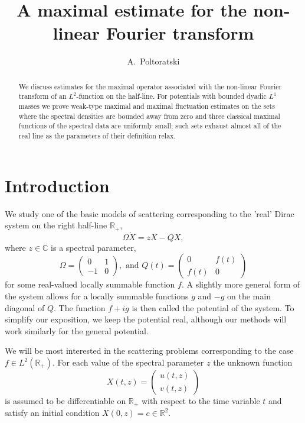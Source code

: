 \documentclass[11pt,twoside,reqno]{amsart}
\author{A.~Poltoratski}
\def\R{{\mathbb R}}
\def\C{{\mathbb{C}}}
\theoremstyle{plain}
\numberwithin{equation}{section}
\begin{document}
\begin{abstract} We discuss estimates for the maximal operator associated with the non-linear Fourier transform of an $L^2$-function on the half-line. For potentials with bounded dyadic $L^1$ masses we  prove weak-type maximal and maximal fluctuation estimates on the sets where the spectral densities are bounded away from zero and three classical maximal functions of the spectral data are uniformly small; such sets exhaust almost all of the real line as the parameters of their definition relax.
\end{abstract}

\title{A maximal estimate for the non-linear Fourier transform}





\maketitle

\section{Introduction}

We study one of the basic models of scattering corresponding to the 'real' Dirac system on the right half-line $\R_+$,
\begin{equation} \Omega \dot X =z X - QX,
	\label{eqDS}\end{equation}
where $z\in\C$ is a spectral parameter,
$$ \Omega=\begin{pmatrix} 0 & 1 \\ -1 & 0 \end{pmatrix},\textrm{ and  }Q(t)=\begin{pmatrix} 0 & f(t) \\ f(t) & 0 \end{pmatrix} $$
for some real-valued locally summable function $f$. A slightly more general form of the system allows
for a locally summable functions $g$ and $-g$ on the main diagonal of $Q$. The function $f+ig$
is then called the potential of the system.
To simplify our exposition, we keep the potential real, although our methods will work similarly
for the general potential.

We will be most interested in  the scattering
problems corresponding to the case $f\in L^2(\R_+)$. For each value of the spectral parameter $z$ the unknown function $$X(t,z)=\begin{pmatrix} u(t,z) \\ v(t,z) \end{pmatrix}$$
is assumed to be differentiable on $\R_+$  with respect to the time variable $t$ and satisfy an initial condition  $X(0,z)=c\in \R^2$.
\end{document}
